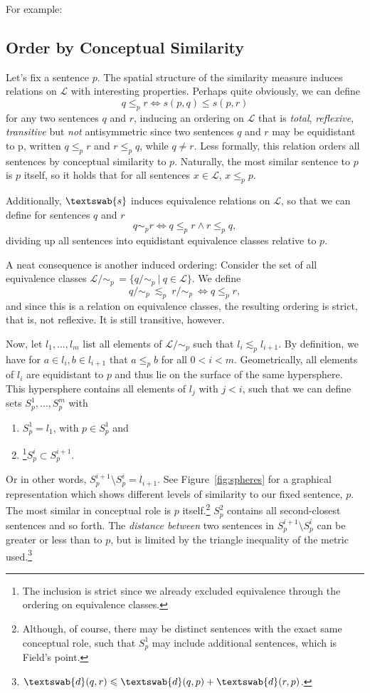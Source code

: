 \documentclass[11pt, a4paper]{scrartcl}
\renewcommand{\i}[1]{\emph{#1}}
\renewcommand{\L}{\mathcal{L}}
\newcommand{\m}[1]{\textswab{#1}}
\newcommand{\given}[1][]{\:#1\vert\:}
\begin{document}
For example:

\subsection{Order by Conceptual Similarity}\label{sec:order}

Let's fix a sentence $p$. The spatial structure of the similarity measure induces relations on $\L$ with interesting properties. Perhaps quite obviously, we can define 
\[
    q \leqslant_p r \Leftrightarrow s(p,q) \leqslant s(p,r)
\]
for any two sentences $q$ and $r$, inducing an ordering on $\L$ that is \i{total}, \i{reflexive}, \i{transitive} but \i{not} antisymmetric since two sentences $q$ and $r$ may be equidistant to p, written $q \leqslant_p r$ and $r \leqslant_p q$, while $q \not = r$. Less formally, this relation orders all sentences by conceptual similarity to $p$. Naturally, the most similar sentence to $p$ is $p$ itself, so it holds that for all sentences ${x \in \L}$, ${x\leqslant_p p}$.

Additionally, $\m{s}$ induces equivalence relations on $\L$, so that we can define for sentences $q$ and $r$ 
\[
    q \sim_p r \Leftrightarrow q \leqslant_p r \land r \leqslant_p q,
\]
dividing up all sentences into equidistant equivalence classes relative to $p$.

A neat consequence is another induced ordering: Consider the set of all equivalence classes $\L/\!\sim_p\,=\{ q/\!\sim_p \given q\in \L \}$. We define   
\[
    q/\!\sim_p~\lesssim_p~r/\!\sim_p~\Leftrightarrow q \leqslant_p r, 
\]
and since this is a relation on equivalence classes, the resulting ordering is strict, that is, not reflexive. It is still transitive, however.

Now, let $l_1, \ldots, l_m$ list all elements of $\L/\!\sim_p$ such that $l_i \lesssim_p l_{i+1}$. By definition, we have for $a \in l_i, b \in l_{i+1}$ that $a \leqslant_p b$ for all $0 < i < m$. Geometrically, all elements of $l_i$ are equidistant to $p$ and thus lie on the surface of the same hypersphere. This hypersphere contains all elements of $l_j$ with $j < i$, such that we can define sets $S^1_p, \ldots, S^m_p$ with 
\begin{enumerate}[label = (\roman*)]
    \item $S^1_p = l_1$, with $p \in S^1_p$ and 
    \item\footnote{The inclusion is strict since we already excluded equivalence through the ordering on equivalence classes.}$S^i_p \subset S^{i+1}_p$. 
\end{enumerate}
Or in other words, $S^{i+1}_p \setminus S^{i}_p = l_{i+1}$. See Figure~\ref{fig:spheres} for a graphical representation which shows different levels of similarity to our fixed sentence, $p$. The most similar in conceptual role is $p$ itself.\footnote{Although, of course, there may be distinct sentences with the exact same conceptual role,  such that $S^1_p$ may include additional sentences, which is Field's point.} $S^2_p$ contains all second-closest sentences and so forth. The \i{distance between} two sentences in $S^{i+1}_p\setminus S^{i}_p$ can be greater or less than to $p$, but is limited by the triangle inequality of the metric used.\footnote{$\m{d}(q,r) \leqslant \m{d}(q,p) + \m{d}(r,p)$.} 
\end{document}
